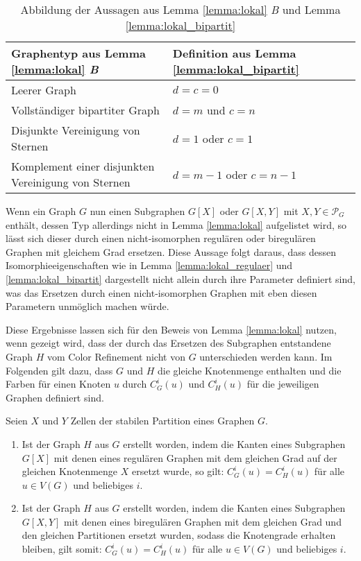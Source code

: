 \begin{table}
	\centering
	\caption{Abbildung der Aussagen aus Lemma \ref{lemma:lokal} \emph{B} und Lemma \ref{lemma:lokal_bipartit}}
	\label{tab:mapping_bipartit}
	\begin{tabular}{|l|l|}
		\hline 
		Graphentyp aus Lemma \ref{lemma:lokal} \emph{B} & Definition aus Lemma \ref{lemma:lokal_bipartit} \\ 
		\hline 
		Leerer Graph & $d=c=0$ \\ 
		\hline 
		Vollständiger bipartiter Graph & $d=m$ und $c=n$ \\ 
		\hline 
		Disjunkte Vereinigung von Sternen & $d=1$ oder $c=1$ \\ 
		\hline 
		Komplement einer disjunkten Vereinigung von Sternen & $d=m-1$ oder $c=n-1$ \\ 
		\hline 
	\end{tabular} 
\end{table}

Wenn ein Graph $G$ nun einen Subgraphen $G[X]$ oder $G[X,Y]$ mit $X,Y\in \mathcal{P}_G$ enthält, dessen Typ allerdings nicht in Lemma \ref{lemma:lokal} aufgelistet wird, so lässt sich dieser durch einen nicht-isomorphen regulären oder biregulären Graphen mit gleichem Grad ersetzen. Diese Aussage folgt daraus, dass dessen Isomorphieeigenschaften wie in Lemma \ref{lemma:lokal_regulaer} und \ref{lemma:lokal_bipartit} dargestellt nicht allein durch ihre Parameter definiert sind, was das Ersetzen durch einen nicht-isomorphen Graphen mit eben diesen Parametern unmöglich machen würde.

Diese Ergebnisse lassen sich für den Beweis von Lemma \ref{lemma:lokal} nutzen, wenn gezeigt wird, dass der durch das Ersetzen des Subgraphen entstandene Graph $H$ vom Color Refinement nicht von $G$ unterschieden werden kann. Im Folgenden gilt dazu, dass $G$ und $H$ die gleiche Knotenmenge enthalten und die Farben für einen Knoten $u$ durch $C^i_G(u)$ und $C^i_H(u)$ für die jeweiligen Graphen definiert sind.

\begin{Lemma}
	Seien $X$ und $Y$ Zellen der stabilen Partition eines Graphen $G$.
	\begin{enumerate}[label=(\alph*)]
		\item  Ist der Graph $H$ aus $G$ erstellt worden, indem die Kanten eines Subgraphen $G[X]$ mit denen eines regulären Graphen mit dem gleichen Grad auf der gleichen Knotenmenge $X$ ersetzt wurde, so gilt: $C^i_G(u)=C^i_H(u)$ für alle $u\in V(G)$ und beliebiges $i$.
		\item Ist der Graph $H$ aus $G$ erstellt worden, indem die Kanten eines Subgraphen $G[X,Y]$ mit denen eines biregulären Graphen mit dem gleichen Grad und den gleichen Partitionen ersetzt wurden, sodass die Knotengrade erhalten bleiben, gilt somit: $C^i_G(u)=C^i_H(u)$ für alle $u\in V(G)$ und beliebiges $i$.
	\end{enumerate}
	\label{lemma:lokal_nicht_unterscheidbar}
\end{Lemma}

